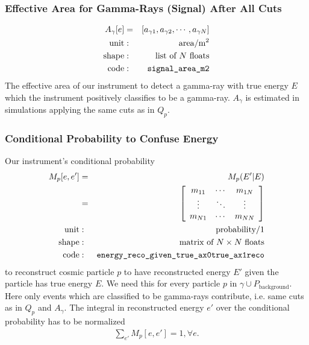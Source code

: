 \documentclass{article}%
\begin{document}
        \subsubsection*{Effective Area for Gamma-Rays (Signal) After All Cuts}
            \begin{eqnarray*}
                A_\gamma[e] &=& [a_{\gamma 1}, a_{\gamma 2}, \cdots, a_{\gamma N}]\\
                \text{unit} &:& \text{area} / \text{m}^{2}\\
                \text{shape} &:& \text{list of}\,\,N\,\,\text{floats}\\
                \text{code} &:& \verb|signal_area_m2|
            \end{eqnarray*}
            The effective area of our instrument to detect a gamma-ray with true energy $E$ which the instrument positively classifies to be a gamma-ray.
            $A_\gamma$ is estimated in simulations applying the same cuts as in $Q_p$.
        \subsubsection*{Conditional Probability to Confuse Energy}
            Our instrument's conditional probability
            \begin{eqnarray*}
                M_p[e, e'] &=& M_p(E' \vert E)\\
                &=&
                  \left[ {\begin{array}{ccc}
                    m_{11} & \cdots & m_{1N}\\
                    \vdots & \ddots & \vdots\\
                    m_{N1} & \cdots & m_{NN}\\
                  \end{array} } \right]\\
                \text{unit} &:& \text{probability}/1\\
                \text{shape} &:& \text{matrix of}\,\,N \times N \,\,\text{floats}\\
                \text{code} &:& \verb|energy_reco_given_true_ax0true_ax1reco|
            \end{eqnarray*}
            to reconstruct cosmic particle $p$ to have reconstructed energy $E'$ given the particle has true energy $E$.
            We need this for every particle $p$ in $\gamma \cup P_\text{background}$.
            Here only events which are classified to be gamma-rays contribute, i.e. same cuts as in $Q_p$ and $A_\gamma$.
            The integral in reconstructed energy $e'$ over the conditional probability has to be normalized
            \begin{eqnarray*}
                \sum_{e'} M_p[e, e'] = 1, \forall e.
            \end{eqnarray*}
\end{document}

